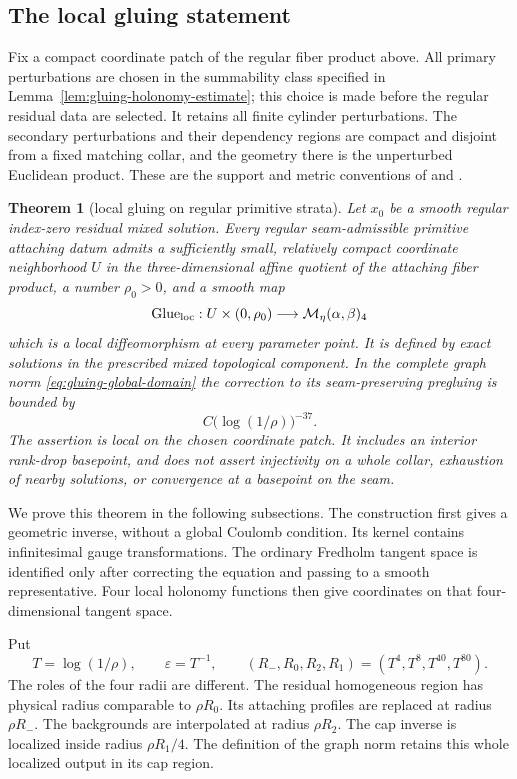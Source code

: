 \documentclass[11pt]{amsart}
\newtheorem{theorem}{Theorem}[section]
\theoremstyle{definition}
\theoremstyle{remark}
\theoremstyle{plain}
\newcommand{\cM}{\mathcal{M}}
\newcommand{\Glue}{\operatorname{Glue}}
\begin{document}
\subsection{The local gluing statement}

Fix a compact coordinate patch of the regular fiber product above.
All primary perturbations are chosen in the summability class specified
in Lemma~\ref{lem:gluing-holonomy-estimate}; this choice is made before
the regular residual data are selected. It retains all finite cylinder
perturbations. The secondary perturbations and their dependency regions
are compact and disjoint from a fixed matching collar, and the geometry
there is the unperturbed Euclidean product. These are the support and
metric conventions of \cite[Proposition~3.23(i)]{DaeFukLip21a} and
\cite[Section~1]{DaeFukLip21b}.

\begin{theorem}[local gluing on regular primitive strata]
\label{thm:regular-local-gluing}
Let $x_0$ be a smooth regular index-zero residual mixed solution.
Every regular seam-admissible primitive attaching datum admits a
sufficiently small, relatively compact coordinate neighborhood $U$
in the three-dimensional affine quotient of the attaching fiber product,
a number $\rho_0>0$, and a smooth map
\[
 \Glue_{\rm loc}:U\times(0,\rho_0)
                    \longrightarrow\cM_\eta(\alpha,\beta)_4
\]
which is a local diffeomorphism at every parameter point. It is defined
by exact solutions in the prescribed mixed topological component.
In the complete graph norm \eqref{eq:gluing-global-domain} the correction
to its seam-preserving pregluing is bounded by
\[
                         C\bigl(\log(1/\rho)\bigr)^{-37}.
\]
The assertion is local on the chosen coordinate patch. It includes
an interior rank-drop basepoint, and does not assert injectivity on a
whole collar, exhaustion of nearby solutions, or convergence at a
basepoint on the seam.
\end{theorem}

We prove this theorem in the following subsections. The construction
first gives a geometric inverse, without a global Coulomb condition.
Its kernel contains infinitesimal gauge transformations. The ordinary
Fredholm tangent space is identified only after correcting the equation
and passing to a smooth representative. Four local holonomy functions
then give coordinates on that four-dimensional tangent space.

Put
\begin{equation}\label{eq:gluing-four-radii}
 T=\log(1/\rho),\qquad \varepsilon=T^{-1},\qquad
 (R_-,R_0,R_2,R_1)=(T^4,T^8,T^{40},T^{80}).
\end{equation}
The roles of the four radii are different. The residual homogeneous
region has physical radius comparable to $\rho R_0$. Its attaching
profiles are replaced at radius $\rho R_-$. The backgrounds are
interpolated at radius $\rho R_2$. The cap inverse is localized inside
radius $\rho R_1/4$. The definition of the graph norm retains this
whole localized output in its cap region.
\end{document}

